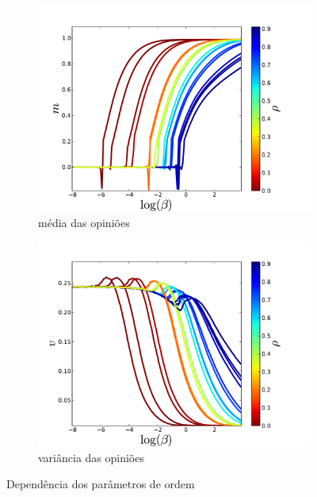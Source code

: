 \begin{figure} 
    \centering
    \begin{subfigure}[]{0.46\textwidth}
        \centering
        \caption{média das opiniões}
        \includegraphics[width = \textwidth]{Figures/mag}
    \end{subfigure}
    \begin{subfigure}[]{0.46\textwidth}
        \centering
        \caption{variância das opiniões}
        \includegraphics[width = \textwidth]{Figures/sigma}
    \end{subfigure}
    \newline
    \caption{
        Dependência dos parâmetros de ordem
    }
    \label{fig:ordem}
\end{figure}

